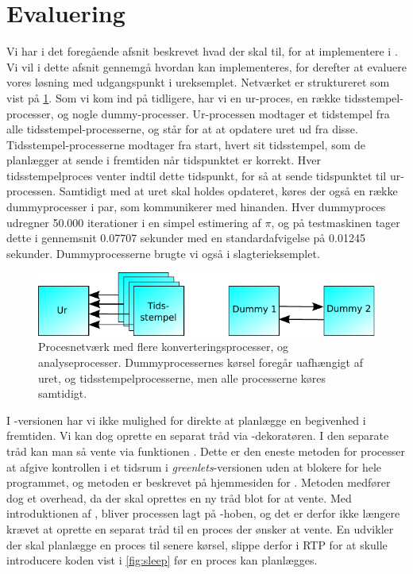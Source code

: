 \section{Evaluering}
Vi har i det foregående afsnit beskrevet hvad der skal til, for at implementere \is i \pycsp. Vi vil i dette afsnit gennemgå hvordan \is kan implementeres, for derefter at evaluere vores løsning med udgangspunkt i ureksemplet.
Netværket er struktureret som vist på \cref{fig:watch_network}. Som vi kom ind på tidligere, har vi en ur-proces, en række tidsstempel-processer, og nogle dummy-processer. Ur-processen modtager et tidstempel fra alle  tidsstempel-processerne, og står for at at opdatere uret ud fra disse. Tidsstempel-processerne modtager fra start, hvert sit tidsstempel, som de planlægger at sende i fremtiden når tidspunktet er korrekt. Hver tidsstempelproces  venter indtil dette tidspunkt, for så at sende tidspunktet til ur-processen. Samtidigt med at uret skal holdes opdateret, køres der også en række dummyprocesser i par, som kommunikerer med hinanden. Hver dummyproces udregner 50.000 iterationer i en simpel estimering af $\pi$, og på testmaskinen tager dette i gennemsnit 0.07707 sekunder med en standardafvigelse på 0.01245 sekunder. Dummyprocesserne brugte vi også i slagterieksemplet.
\begin{figure}
 \begin{center}
  \includegraphics[scale=1]{images/watch-network}
	\caption{Procesnetværk med flere konverteringsprocesser, og analyseprocesser. Dummyprocessernes kørsel foregår uafhængigt af uret, og tidsstempelprocesserne, men alle processerne køres samtidigt.}
	\label{fig:watch_network}
\end{center}
\end{figure}

I -versionen har vi ikke mulighed for direkte at planlægge en begivenhed i fremtiden. Vi kan dog oprette en separat tråd  via -dekoratøren. I den separate tråd kan man så vente via funktionen . Dette er den eneste metoden for processer at afgive kontrollen i et tidsrum i \emph{greenlets}-versionen uden at blokere for hele programmet, og metoden er beskrevet på  hjemmesiden for \pycsp. Metoden medfører dog et overhead, da der skal oprettes en ny tråd blot for at vente.  Med introduktionen af , bliver processen lagt på -hoben, og det er derfor ikke længere krævet at oprette en separat tråd til en proces der ønsker at vente. En udvikler der skal planlægge en proces til senere kørsel, slippe derfor i RTP for at skulle introducere koden vist i \cref{fig:sleep} før en proces kan planlægges.

